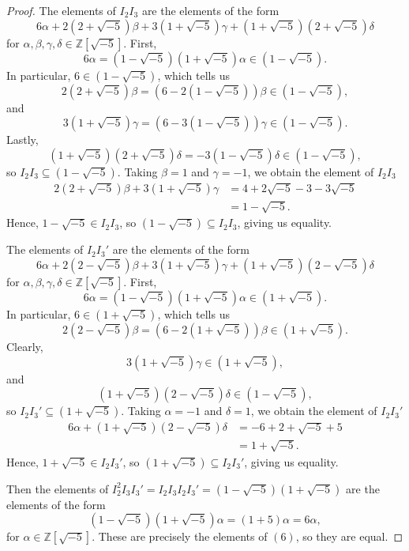 \documentclass[12pt]{article}
\theoremstyle{definition}
\newcommand{\Z}{\mathbb{Z}}
\begin{document}
\begin{proof}
    The elements of $I_2 I_3$ are the elements of the form
    \[
        6\alpha + 2(2 + \sqrt{-5})\beta + 3(1 + \sqrt{-5})\gamma + (1 + \sqrt{-5})(2 + \sqrt{-5})\delta
    \]
    for $\alpha, \beta, \gamma, \delta \in \Z[\sqrt{-5}]$. First,
    \[
        6\alpha = (1 - \sqrt{-5})(1 + \sqrt{-5})\alpha \in (1 - \sqrt{-5}).
    \]
    In particular, $6 \in (1 - \sqrt{-5})$, which tells us
    \[
        2(2 + \sqrt{-5})\beta = (6 - 2(1 - \sqrt{-5}))\beta \in (1 - \sqrt{-5}),
    \]
    and
    \[
         3(1 + \sqrt{-5})\gamma = (6 - 3(1 - \sqrt{-5}))\gamma \in (1 - \sqrt{-5}).
    \]
    Lastly,
    \[
         (1 + \sqrt{-5})(2 + \sqrt{-5})\delta = -3(1 - \sqrt{-5})\delta \in (1 - \sqrt{-5}),
    \]
    so $I_2I_3 \subseteq (1 - \sqrt{-5})$. Taking $\beta = 1$ and $\gamma = -1$, we obtain the element of $I_2I_3$
    \begin{align*}
        2(2 + \sqrt{-5})\beta + 3(1 + \sqrt{-5})\gamma
            &= 4 + 2\sqrt{-5} - 3 - 3\sqrt{-5} \\
            &= 1 - \sqrt{-5}.
    \end{align*}
    Hence, $1 - \sqrt{-5} \in I_2I_3$, so $(1 - \sqrt{-5}) \subseteq I_2I_3$, giving us equality.
    
    The elements of $I_2 I_3'$ are the elements of the form
    \[
        6\alpha + 2(2 - \sqrt{-5})\beta + 3(1 + \sqrt{-5})\gamma + (1 + \sqrt{-5})(2 - \sqrt{-5})\delta
    \]
    for $\alpha, \beta, \gamma, \delta \in \Z[\sqrt{-5}]$. First,
    \[
        6\alpha = (1 - \sqrt{-5})(1 + \sqrt{-5})\alpha \in (1 + \sqrt{-5}).
    \]
    In particular, $6 \in (1 + \sqrt{-5})$, which tells us
    \[
        2(2 - \sqrt{-5})\beta = (6 - 2(1 + \sqrt{-5}))\beta \in (1 + \sqrt{-5}).
    \]
    Clearly,
    \[
         3(1 + \sqrt{-5})\gamma \in (1 + \sqrt{-5}),
    \]
    and
    \[
         (1 + \sqrt{-5})(2 - \sqrt{-5})\delta \in (1 - \sqrt{-5}),
    \]
    so $I_2I_3' \subseteq (1 + \sqrt{-5})$. Taking $\alpha = -1$ and $\delta = 1$, we obtain the element of $I_2I_3'$
    \begin{align*}
        6\alpha + (1 + \sqrt{-5})(2 - \sqrt{-5})\delta
            &= -6 + 2 + \sqrt{-5} + 5 \\
            &= 1 + \sqrt{-5}.
    \end{align*}
    Hence, $1 + \sqrt{-5} \in I_2I_3'$, so $(1 + \sqrt{-5}) \subseteq I_2I_3'$, giving us equality.
    
    Then the elements of $I_2^2 I_3 I_3' = I_2I_3I_2I_3' = (1 - \sqrt{-5})(1 + \sqrt{-5})$ are the elements of the form
    \[
        (1 - \sqrt{-5})(1 + \sqrt{-5})\alpha = (1 + 5) \alpha = 6\alpha,
    \]
    for $\alpha \in \Z[\sqrt{-5}]$. These are precisely the elements of $(6)$, so they are equal.
        
\end{proof}
\end{document}
